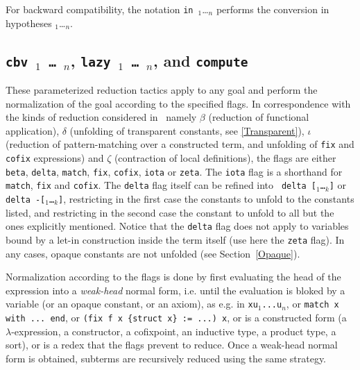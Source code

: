 \begin{coq_example*}
For backward compatibility, the notation \texttt{in}~{\ident}$_1$\ldots {\ident}$_n$
performs the conversion in hypotheses {\ident}$_1$\ldots {\ident}$_n$.


\subsection{{\tt cbv \flag$_1$ \mbox{\dots} \flag$_n$}, {\tt lazy \flag$_1$
\mbox{\dots} \flag$_n$}, and \tt compute}
\label{vmcompute}
\label{nativecompute}

These parameterized reduction tactics apply to any goal and perform
the normalization of the goal according to the specified flags. In
correspondence with the kinds of reduction considered in \Coq\, namely
$\beta$ (reduction of functional application), $\delta$ (unfolding of
transparent constants, see \ref{Transparent}), $\iota$ (reduction of
pattern-matching over a constructed term, and unfolding of {\tt fix}
and {\tt cofix} expressions) and $\zeta$ (contraction of local
definitions), the flags are either {\tt beta}, {\tt delta},
{\tt match}, {\tt fix}, {\tt cofix}, {\tt iota} or {\tt zeta}.
The {\tt iota} flag is a shorthand for {\tt match}, {\tt fix} and {\tt cofix}.
The {\tt delta} flag itself can be refined into {\tt
delta [\qualid$_1$\ldots\qualid$_k$]} or {\tt delta
-[\qualid$_1$\ldots\qualid$_k$]}, restricting in the first case the
constants to unfold to the constants listed, and restricting in the
second case the constant to unfold to all but the ones explicitly
mentioned. Notice that the {\tt delta} flag does not apply to
variables bound by a let-in construction inside the term itself (use
here the {\tt zeta} flag). In any cases, opaque constants are not
unfolded (see Section~\ref{Opaque}).

Normalization according to the flags is done by first evaluating the
head of the expression into a {\em weak-head} normal form, i.e. until
the evaluation is bloked by a variable (or an opaque constant, or an
axiom), as e.g. in {\tt x\;u$_1$\;...\;u$_n$}, or {\tt match x with
  ... end}, or {\tt (fix f x \{struct x\} := ...) x}, or is a
constructed form (a $\lambda$-expression, a constructor, a cofixpoint,
an inductive type, a product type, a sort), or is a redex that the
flags prevent to reduce. Once a weak-head normal form is obtained,
subterms are recursively reduced using the same strategy.


\end{coq_example*}
